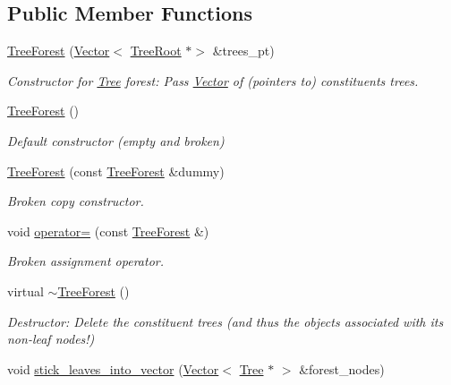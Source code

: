 \subsection*{Public Member Functions}
\begin{DoxyCompactItemize}
\item 
\hyperlink{classoomph_1_1TreeForest_a66b579294848fb2bfff13b24dabda1e8}{Tree\+Forest} (\hyperlink{classoomph_1_1Vector}{Vector}$<$ \hyperlink{classoomph_1_1TreeRoot}{Tree\+Root} $\ast$$>$ \&trees\+\_\+pt)
\begin{DoxyCompactList}\small\item\em Constructor for \hyperlink{classoomph_1_1Tree}{Tree} forest\+: Pass \hyperlink{classoomph_1_1Vector}{Vector} of (pointers to) constituents trees. \end{DoxyCompactList}\item 
\hyperlink{classoomph_1_1TreeForest_ac05719b25a53c4f27d94ed8535bf3d6a}{Tree\+Forest} ()
\begin{DoxyCompactList}\small\item\em Default constructor (empty and broken) \end{DoxyCompactList}\item 
\hyperlink{classoomph_1_1TreeForest_ae53f48ad56b12c57231d8968e5c6ddcc}{Tree\+Forest} (const \hyperlink{classoomph_1_1TreeForest}{Tree\+Forest} \&dummy)
\begin{DoxyCompactList}\small\item\em Broken copy constructor. \end{DoxyCompactList}\item 
void \hyperlink{classoomph_1_1TreeForest_a518492c6567cd08a8fc3812bcdc9d348}{operator=} (const \hyperlink{classoomph_1_1TreeForest}{Tree\+Forest} \&)
\begin{DoxyCompactList}\small\item\em Broken assignment operator. \end{DoxyCompactList}\item 
virtual \hyperlink{classoomph_1_1TreeForest_abc55e7734f5e2de2c6943084008b5248}{$\sim$\+Tree\+Forest} ()
\begin{DoxyCompactList}\small\item\em Destructor\+: Delete the constituent trees (and thus the objects associated with its non-\/leaf nodes!) \end{DoxyCompactList}\item 
void \hyperlink{classoomph_1_1TreeForest_a6d99d1f513a60b9bd053ff98699cbe52}{stick\+\_\+leaves\+\_\+into\+\_\+vector} (\hyperlink{classoomph_1_1Vector}{Vector}$<$ \hyperlink{classoomph_1_1Tree}{Tree} $\ast$ $>$ \&forest\+\_\+nodes)
$$
\end{DoxyCompactItemize}
